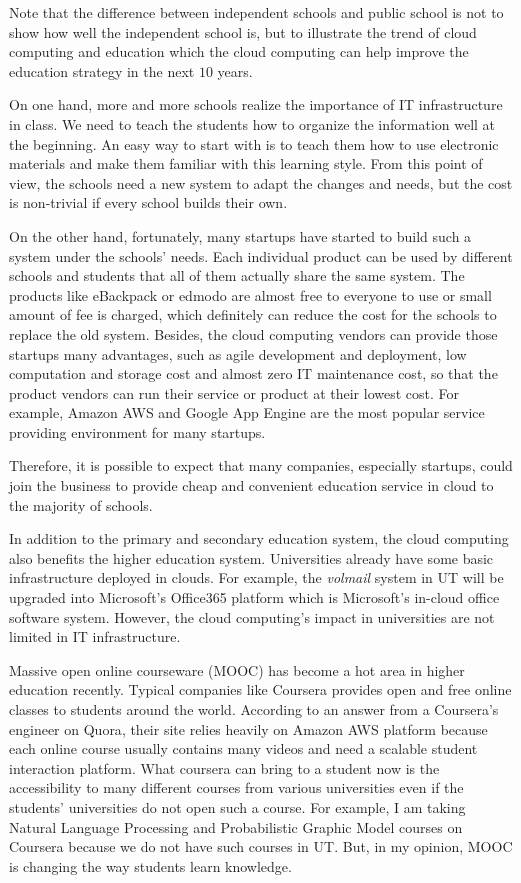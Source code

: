 Note that the difference between independent schools and public school is not to show how well the independent school is, but to illustrate the trend of cloud computing and education which the cloud computing can help improve the education strategy in the next $10$ years.

On one hand, more and more schools realize the importance of IT infrastructure in class. We need to teach the students how to organize the information well at the beginning. An easy way to start with is to teach them how to use electronic materials and make them familiar with this learning style. From this point of view, the schools need a new system to adapt the changes and needs, but the cost is non-trivial if every school builds their own. 

On the other hand, fortunately, many startups have started to build such a system under the schools' needs. Each individual product can be used by different schools and students that all of them actually share the same system. The products like eBackpack or edmodo are almost free to everyone to use or small amount of fee is charged, which definitely can reduce the cost for the schools to replace the old system. Besides, the cloud computing vendors can provide those startups many advantages, such as agile development and deployment, low computation and storage cost and almost zero IT maintenance cost, so that the product vendors can run their service or product at their lowest cost. For example, Amazon AWS and Google App Engine are the most popular service providing environment for many startups.

Therefore, it is possible to expect that many companies, especially startups, could join the business to provide cheap and convenient education service in cloud to the majority of schools.

In addition to the primary and secondary education system, the cloud computing also benefits the higher education system. Universities already have some basic infrastructure deployed in clouds. For example, the \emph{volmail} system in UT will be upgraded into Microsoft's Office365 platform which is Microsoft's in-cloud office software system. However, the cloud computing's impact in universities are not limited in IT infrastructure.

Massive open online courseware (MOOC) has become a hot area in higher education recently. Typical companies like Coursera provides open and free online classes to students around the world. According to an answer from a Coursera's engineer on Quora\cite{quora2coursera}, their site relies heavily on Amazon AWS platform because each online course usually contains many videos and need a scalable student interaction platform. What coursera can bring to a student now is the accessibility to many different courses from various universities even if the students' universities do not open such a course. For example, I am taking Natural Language Processing and Probabilistic Graphic Model courses on Coursera because we do not have such courses in UT. But, in my opinion, MOOC is changing the way students learn knowledge. 

